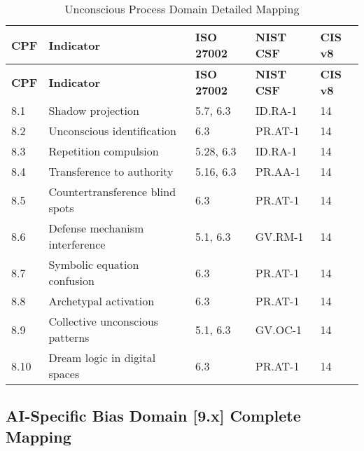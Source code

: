 \documentclass[11pt,a4paper]{article}
\begin{document}
\begin{longtable}{p{1cm}p{4cm}p{2.5cm}p{2.5cm}p{2cm}}
\caption{Unconscious Process Domain Detailed Mapping} \\
\toprule
\textbf{CPF} & \textbf{Indicator} & \textbf{ISO 27002} & \textbf{NIST CSF} & \textbf{CIS v8} \\
\midrule
\endfirsthead
\toprule
\textbf{CPF} & \textbf{Indicator} & \textbf{ISO 27002} & \textbf{NIST CSF} & \textbf{CIS v8} \\
\midrule
\endhead
\bottomrule
\endlastfoot

8.1 & Shadow projection & 5.7, 6.3 & ID.RA-1 & 14 \\
8.2 & Unconscious identification & 6.3 & PR.AT-1 & 14 \\
8.3 & Repetition compulsion & 5.28, 6.3 & ID.RA-1 & 14 \\
8.4 & Transference to authority & 5.16, 6.3 & PR.AA-1 & 14 \\
8.5 & Countertransference blind spots & 6.3 & PR.AT-1 & 14 \\
8.6 & Defense mechanism interference & 5.1, 6.3 & GV.RM-1 & 14 \\
8.7 & Symbolic equation confusion & 6.3 & PR.AT-1 & 14 \\
8.8 & Archetypal activation & 6.3 & PR.AT-1 & 14 \\
8.9 & Collective unconscious patterns & 5.1, 6.3 & GV.OC-1 & 14 \\
8.10 & Dream logic in digital spaces & 6.3 & PR.AT-1 & 14 \\

\end{longtable}

\subsection{AI-Specific Bias Domain [9.x] Complete Mapping}
\end{document}
